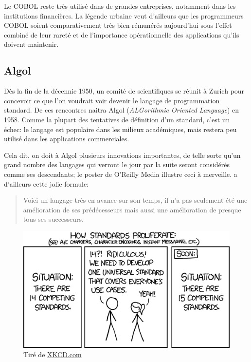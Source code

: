 Le COBOL reste très utilisé dans de grandes entreprises, notamment
dans les institutions financières. La légende urbaine veut d'ailleurs
que les programmeurs COBOL soient comparativement très bien rémunérés
aujourd'hui sous l'effet combiné de leur rareté et de l'importance
opérationnelle des applications qu'ils doivent maintenir.

\subsection{Algol}
\label{sec:informatique:historique:algol}

Dès la fin de la décennie 1950, un comité de scientifiques se réunit à
Zurich pour concevoir ce que l'on voudrait voir devenir le langage de
programmation standard. De ces rencontres naitra Algol
(\emph{ALGorithmic Oriented Language}) en 1958. Comme la plupart des
tentatives de définition d'un standard, c'est un échec: le langage est
populaire dans les milieux académiques, mais restera peu utilisé dans
les applications commerciales.

Cela dit, on doit à Algol plusieurs innovations importantes, de telle
sorte qu'un grand nombre des langages qui verront le jour par la suite
seront considérés comme ses descendants; le poster
 de O'Reilly Media illustre ceci à
merveille. \citet{Hoare:1973} a d'ailleurs cette jolie formule:
\begin{quote}
  Voici un langage très en avance sur son temps, il n'a pas seulement
  été une amélioration de ses prédécesseurs mais aussi une
  amélioration de presque tous ses successeurs.
\end{quote}

\begin{figure}[t]
  \centering
  \begin{minipage}{0.9\linewidth}
    \includegraphics{images/standards} \\
    \footnotesize\sffamily%
    Tiré de \href{http://xkcd.com/927/}{XKCD.com}
  \end{minipage}
\end{figure}

